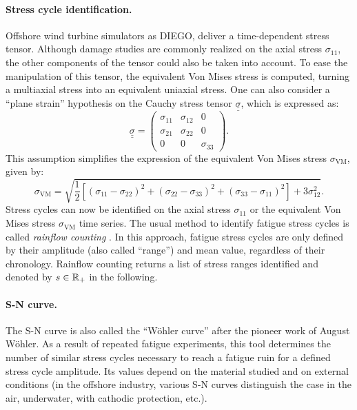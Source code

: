 \paragraph{Stress cycle identification.}
Offshore wind turbine simulators as DIEGO, deliver a time-dependent stress tensor. 
Although damage studies are commonly realized on the axial stress $\sigma_{11}$, the other components of the tensor could also be taken into account. 
To ease the manipulation of this tensor, the equivalent Von Mises stress is computed, turning a multiaxial stress into an equivalent uniaxial stress. 
One can also consider a ``plane strain'' hypothesis on the Cauchy stress tensor $\underline{\underline{\sigma}}$, which is expressed as:
\begin{equation}
    \underline{\underline{\sigma}} = \begin{pmatrix}
                            \sigma_{11} & \sigma_{12} & 0\\
                            \sigma_{21} & \sigma_{22} & 0\\
                            0 & 0 & \sigma_{33}
                            \end{pmatrix}.
\end{equation}
This assumption simplifies the expression of the equivalent Von Mises stress $\sigma_{\mathrm{VM}}$, given by: 
\begin{equation}
    \sigma_{\mathrm{VM}}=\sqrt{{\frac {1}{2}}\left[(\sigma _{11}-\sigma _{22})^{2}+(\sigma _{22}-\sigma _{33})^{2}+(\sigma _{33}-\sigma _{11})^{2}\right] + 3 \sigma _{12}^{2}}.
\end{equation}
Stress cycles can now be identified on the axial stress $\sigma_{11}$ or the equivalent Von Mises stress $\sigma_{\mathrm{VM}}$ time series. 
The usual method to identify fatigue stress cycles is called \textit{rainflow counting} \citep{dowling_1972}. 
In this approach, fatigue stress cycles are only defined by their amplitude (also called ``range'') and mean value, regardless of their chronology. 
Rainflow counting returns a list of stress ranges identified and denoted by $s \in \mathbb{R}_+$ in the following. 


\paragraph{S-N curve.}
The S-N curve is also called the ``W\"ohler curve'' after the pioneer work of August W\"ohler. %
As a result of repeated fatigue experiments, this tool determines the number of similar stress cycles necessary to reach a fatigue ruin for a defined stress cycle amplitude. 
Its values depend on the material studied and on external conditions (in the offshore industry, various S-N curves distinguish the case in the air, underwater, with cathodic protection, etc.). 

